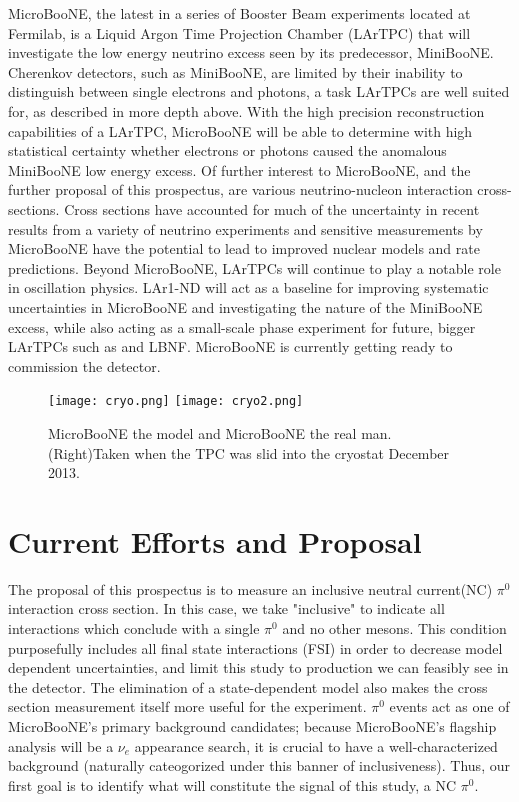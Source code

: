 \documentclass[12pt]{article}
\begin{document}
MicroBooNE, the latest in a series of Booster Beam experiments located at Fermilab, is a Liquid Argon Time Projection Chamber (LArTPC) that will investigate the low energy neutrino excess seen by its predecessor, MiniBooNE. Cherenkov detectors, such as MiniBooNE, are limited by their inability to distinguish between single electrons and photons, a task LArTPCs are well suited for, as described in more depth above. With the high precision reconstruction capabilities of a LArTPC, MicroBooNE will be able to determine with high statistical certainty whether electrons or photons caused the anomalous MiniBooNE low energy excess. Of further interest to MicroBooNE, and the further proposal of this prospectus, are various neutrino-nucleon interaction cross-sections. Cross sections have accounted for much of the uncertainty in recent results from a variety of neutrino experiments\cite{miniboone} and sensitive measurements by MicroBooNE have the potential to lead to improved nuclear models and rate predictions. Beyond MicroBooNE, LArTPCs will continue to play a notable role in oscillation physics. LAr1-ND will act as a baseline for improving systematic uncertainties in MicroBooNE and investigating the nature of the MiniBooNE excess, while also acting as a small-scale phase experiment for future, bigger LArTPCs such as and LBNF. MicroBooNE is currently getting ready to commission the detector.
\begin{figure}[h!]
\texttt{[image: cryo.png]}
\hspace{2 cm}
\texttt{[image: cryo2.png]}
\caption{MicroBooNE the model and MicroBooNE the real man. (Right)Taken when the TPC was slid into the cryostat December 2013.}
\end{figure}

\section{Current Efforts and Proposal}
\par The proposal of this prospectus is to measure an inclusive neutral current(NC) $\pi^0$ interaction cross section. In this case, we take "inclusive" to indicate all interactions which conclude with a single $\pi^0$ and no other mesons. This condition purposefully includes all final state interactions (FSI) in order to decrease model dependent uncertainties, and limit this study to production we can feasibly see in the detector.  The elimination of a state-dependent model also makes the cross section measurement itself more useful for the experiment. $\pi^0$ events act as one of MicroBooNE's primary background candidates; because MicroBooNE's flagship analysis will be a $\nu_e$ appearance search, it is crucial to have a well-characterized background (naturally cateogorized under this banner of inclusiveness). Thus, our first goal is to identify what will constitute the signal of this study, a NC $\pi^0$. 
\end{document}
